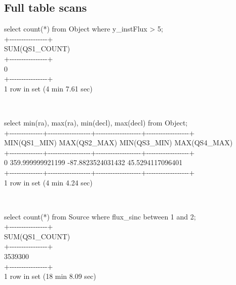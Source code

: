 \documentclass[DM,toc]{lsstdoc}
\begin{document}
\subsection{Full table scans}\label{full-table-scans}

select count(*) from Object where y\_instFlux \textgreater{} 5;\\
+-\/-\/-\/-\/-\/-\/-\/-\/-\/-\/-\/-\/-\/-\/-\/-+\\
\textbar{} SUM(QS1\_COUNT) \textbar{}\\
+-\/-\/-\/-\/-\/-\/-\/-\/-\/-\/-\/-\/-\/-\/-\/-+\\
\textbar{} 0 \textbar{}\\
+-\/-\/-\/-\/-\/-\/-\/-\/-\/-\/-\/-\/-\/-\/-\/-+\\
1 row in set (4 min 7.61 sec)

~

select min(ra), max(ra), min(decl), max(decl) from Object;\\
+-\/-\/-\/-\/-\/-\/-\/-\/-\/-\/-\/-\/-\/-+-\/-\/-\/-\/-\/-\/-\/-\/-\/-\/-\/-\/-\/-\/-\/-\/-\/-+-\/-\/-\/-\/-\/-\/-\/-\/-\/-\/-\/-\/-\/-\/-\/-\/-\/-\/-+-\/-\/-\/-\/-\/-\/-\/-\/-\/-\/-\/-\/-\/-\/-\/-\/-\/-+\\
\textbar{} MIN(QS1\_MIN) \textbar{} MAX(QS2\_MAX) \textbar{}
MIN(QS3\_MIN) \textbar{} MAX(QS4\_MAX) \textbar{}\\
+-\/-\/-\/-\/-\/-\/-\/-\/-\/-\/-\/-\/-\/-+-\/-\/-\/-\/-\/-\/-\/-\/-\/-\/-\/-\/-\/-\/-\/-\/-\/-+-\/-\/-\/-\/-\/-\/-\/-\/-\/-\/-\/-\/-\/-\/-\/-\/-\/-\/-+-\/-\/-\/-\/-\/-\/-\/-\/-\/-\/-\/-\/-\/-\/-\/-\/-\/-+\\
\textbar{} 0 \textbar{} 359.999999921199 \textbar{} -87.8823524031432
\textbar{} 45.5294117096401 \textbar{}\\
+-\/-\/-\/-\/-\/-\/-\/-\/-\/-\/-\/-\/-\/-+-\/-\/-\/-\/-\/-\/-\/-\/-\/-\/-\/-\/-\/-\/-\/-\/-\/-+-\/-\/-\/-\/-\/-\/-\/-\/-\/-\/-\/-\/-\/-\/-\/-\/-\/-\/-+-\/-\/-\/-\/-\/-\/-\/-\/-\/-\/-\/-\/-\/-\/-\/-\/-\/-+\\
1 row in set (4 min 4.24 sec)

~

select count(*) from Source where flux\_sinc between 1 and 2;\\
+-\/-\/-\/-\/-\/-\/-\/-\/-\/-\/-\/-\/-\/-\/-\/-+\\
\textbar{} SUM(QS1\_COUNT) \textbar{}\\
+-\/-\/-\/-\/-\/-\/-\/-\/-\/-\/-\/-\/-\/-\/-\/-+\\
\textbar{} 3539300 \textbar{}\\
+-\/-\/-\/-\/-\/-\/-\/-\/-\/-\/-\/-\/-\/-\/-\/-+\\
1 row in set (18 min 8.09 sec)
\end{document}
